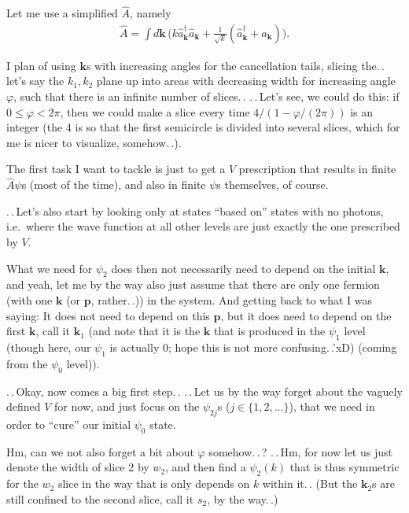 \documentclass{report}
\begin{document}
Let me use a simplified $\hat A$, namely
\begin{align}
	\hat A = \int d\mathbf{k}\, 
		\big(
			k \hat a_\mathbf{k}^\dagger \hat a_\mathbf{k} +
			\frac{1}{\sqrt{k}} ( \hat a_\mathbf{k}^\dagger +  \hat a_\mathbf{k})
		\big).
\end{align}

I plan of using $\mathbf{k}$s with increasing angles for the cancellation tails, slicing the.\,. let's say the $k_1, k_2$ plane up into areas with decreasing width for increasing angle $\varphi$, such that there is an infinite number of slices.\,. 
.\,.\,Let's see, we could do this: if $0\leq\varphi < 2\pi$, then we could make a slice every time $4/(1-\varphi/(2\pi))$ is an integer (the 4 is so that the first semicircle is divided into several slices, which for me is nicer to visualize, somehow.\,.).

The first task I want to tackle is just to get a $V$ prescription that results in finite $\hat A\psi$s (most of the time), and also in finite $\psi$s themselves, of course. %

.\,.\,Let's also start by looking only at states ``based on'' states with no photons, i.e.\ where the wave function at all other levels are just exactly the one prescribed by $V$. 

What we need for $\psi_{2}$ does then not necessarily need to depend on the initial $\mathbf{k}$, and yeah, let me by the way also just assume that there are only one fermion (with one $\mathbf{k}$ (or $\mathbf{p}$, rather.\,.)) in the system. And getting back to what I was saying: It does not need to depend on this $\mathbf{p}$, but it does need to depend on the first $\mathbf{k}$, call it $\mathbf{k}_1$ (and note that it is the $\mathbf{k}$ that is produced in the $\psi_1$ level (though here, our $\psi_1$ is actually 0; hope this is not more confusing.\,.'xD) (coming from the $\psi_0$ level)). 

.\,.\,Okay, now comes a big first step.\,. .\,.\,Let us by the way forget about the vaguely defined $V$ for now, and just focus on the $\psi_{2j}$s ($j\in\{1, 2, \ldots\}$), that we need in order to ``cure'' our initial $\psi_0$ state.

Hm, can we not also forget a bit about $\varphi$ somehow.\,.\,? .\,.\,Hm, for now let us just denote the width of slice 2 by $w_2$, and then find a $\psi_2(k)$ that is thus symmetric for the $w_2$ slice in the way that is only depends on $k$ within it.\,. (But the $\mathbf{k}_2$s are still confined to the second slice, call it $s_2$, by the way.\,.) 
\end{document}
